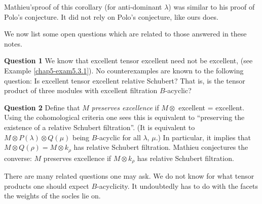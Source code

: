 \begin{remark}\label{chap6-rem6.3.8}
Mathieu's\pageoriginale proof\label{page67} of this corollary (for anti-dominant
$\lambda$) was 
similar to his proof of Polo's conjecture. It did not rely on Polo's
conjecture, like ours does.
\end{remark}

We now list some open questions which are related to those answered in
these notes.

\smallskip
\noindent
{\bf Question 1} We know that excellent tensor excellent need not be
excellent, (see Example \ref{chap5-exam5.3.1}). No counterexamples are
known to the following question: Is excellent tensor excellent
relative Schubert? That is, is the tensor product of three modules
with excellent filtration $B$-acyclic?

\smallskip
\noindent
{\bf Question 2} 
Define that $M$ {\em preserves excellence} if $M\otimes$ excellent =
excellent. Using the cohomological criteria one sees this is
equivalent to ``preserving the existence of a relative Schubert
filtration''. (It is equivalent to $M\otimes P(\lambda)\otimes Q(\mu)$
being $B$-acyclic for all $\lambda$, $\mu$.) In particular, it implies
that $M\otimes Q(\rho)=M\otimes k_{\rho}$ has relative Schubert
filtration. Mathieu conjectures the converse: $M$ preserves excellence
if $M\otimes k_{\rho}$ has relative Schubert filtration.

\begin{remark}\label{chap6-rem6.3.9}
There are many related questions one may ask. We do not know for what
tensor products one should expect $B$-acyclicity. It undoubtedly has
to do with the facets the weights of the socles lie on. 
\end{remark}



